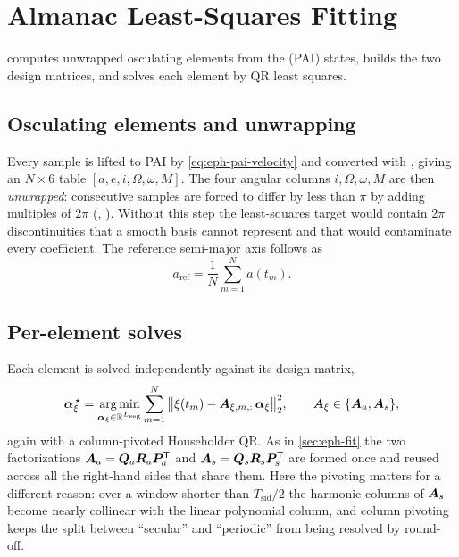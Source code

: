 \section{Almanac Least-Squares Fitting}
\label{sec:eph-almanac-fit}

 \citep[\S8.2, Eqs.~8.2--8.6]{iiyama2026thesis} computes
unwrapped osculating elements from the (PAI) states, builds the two design
matrices, and solves each element by QR least squares.

\subsection{Osculating elements and unwrapping}

Every sample is lifted to PAI by \cref{eq:eph-pai-velocity} and converted with
, giving an $N\times 6$ table
$[a, e, i, \Omega, \omega, M]$. The four angular columns $i, \Omega, \omega,
M$ are then \emph{unwrapped}: consecutive samples are forced to differ by less
than $\pi$ by adding multiples of $2\pi$ (,
). Without this step
the least-squares target would contain $2\pi$ discontinuities that a smooth
basis cannot represent and that would contaminate every coefficient. The
reference semi-major axis follows as
\begin{equation}
  \label{eq:eph-alm-aref}
  a_\mathrm{ref} = \frac{1}{N}\sum_{m=1}^{N} a(t_m).
\end{equation}

\subsection{Per-element solves}

Each element is solved independently against its design matrix,
\begin{equation}
  \label{eq:eph-alm-ls}
  \bm{\alpha}_\xi^{\,\star}
  = \operatorname*{arg\,min}_{\bm{\alpha}_\xi \in \mathbb{R}^{L_\mathrm{seg}}}
    \sum_{m=1}^{N}\big\lVert \xi(t_m) - \bm{A}_{\xi,m,:}\,\bm{\alpha}_\xi \big\rVert_2^2,
  \qquad
  \bm{A}_\xi \in \{\bm{A}_a, \bm{A}_s\},
\end{equation}
again with a column-pivoted Householder QR. As in \cref{sec:eph-fit} the two
factorizations $\bm{A}_a = \bm{Q}_a\bm{R}_a\bm{P}_a^{\mathsf{T}}$ and
$\bm{A}_s = \bm{Q}_s\bm{R}_s\bm{P}_s^{\mathsf{T}}$ are formed once and reused
across all the right-hand sides that share them. Here the pivoting matters for
a different reason: over a window shorter than $T_\mathrm{sid}/2$ the
harmonic columns of $\bm{A}_s$ become nearly collinear with the linear
polynomial column, and column pivoting keeps the split between ``secular'' and
``periodic'' from being resolved by round-off.

